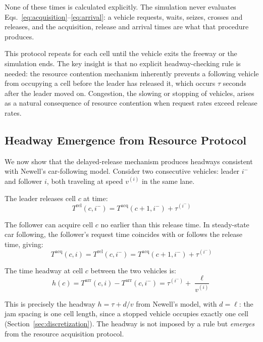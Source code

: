 \documentclass[review,number]{elsarticle}
\newcommand{\Tacq}{T^{\text{acq}}}
\newcommand{\Tarr}{T^{\text{arr}}}
\newcommand{\Trel}{T^{\text{rel}}}
\begin{document}
None of these times is calculated explicitly. The simulation never evaluates Eqs.~\eqref{eq:acquisition}--\eqref{eq:arrival}: a vehicle requests, waits, seizes, crosses and releases, and the acquisition, release and arrival times are what that procedure produces.

This protocol repeats for each cell until the vehicle exits the freeway or the simulation ends. The key insight is that no explicit headway-checking rule is needed: the resource contention mechanism inherently prevents a following vehicle from occupying a cell before the leader has released it, which occurs $\tau$ seconds after the leader moved on. Congestion, the slowing or stopping of vehicles, arises as a natural consequence of resource contention when request rates exceed release rates.

\subsection{Headway Emergence from Resource Protocol}
\label{sec:headway}

We now show that the delayed-release mechanism produces headways consistent with Newell's car-following model. Consider two consecutive vehicles: leader $i^{-}$ and follower $i$, both traveling at speed $v^{(i)}$ in the same lane.

The leader releases cell $c$ at time:
\begin{equation}
    \Trel(c, i^{-}) = \Tacq(c+1, i^{-}) + \tau^{(i^{-})}
\end{equation}

The follower can acquire cell $c$ no earlier than this release time. In steady-state car following, the follower's request time coincides with or follows the release time, giving:
\begin{equation}
    \Tacq(c, i) = \Trel(c, i^{-}) = \Tacq(c+1, i^{-}) + \tau^{(i^{-})}
\end{equation}

The time headway at cell $c$ between the two vehicles is:
\begin{equation}
    h(c) = \Tarr(c, i) - \Tarr(c, i^{-}) = \tau^{(i^{-})} + \frac{\ell}{v^{(i)}}
    \label{eq:headway}
\end{equation}

This is precisely the headway $h = \tau + d/v$ from Newell's model, with $d = \ell$: the jam spacing is one cell length, since a stopped vehicle occupies exactly one cell (Section~\ref{sec:discretization}). The headway is not imposed by a rule but \emph{emerges} from the resource acquisition protocol.
\end{document}
